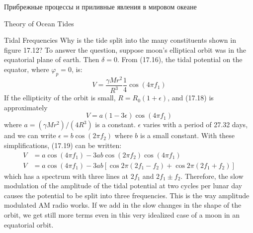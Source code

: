 \begin{chapter}{Прибрежные процессы и приливные явления в мировом океане}
\begin{section}{Theory of Ocean Tides}
\begin{paragraph}{Tidal Frequencies}
Why is the tide split into the many constituents shown in figure
17.12? To answer the question, suppose moon's elliptical orbit was in
the equatorial plane of earth. Then $\delta = 0$. From (17.16), the
tidal potential on the equator, where $\varphi_p =0$, is:
\begin{equation}
V = \frac{\gamma M r^{2}}{R^{3}} \frac{1}{4} \cos \left(4 \pi f_1 \right)
\end{equation}
If the ellipticity of the orbit is small, $R= R_0 (1+\epsilon )$, and
(17.18) is approximately
\begin{equation}
V = a (1-3\epsilon) \cos \left(4 \pi f_1 \right)
\end{equation}
where $a=\left( \gamma M r^2 \right)/\left( 4 R^3 \right)$ is a
constant.  $\epsilon$ varies with a period of 27.32 days, and we can
write $\epsilon = b \cos (2 \pi f_2)$ where $b$ is a small
constant. With these simplifications, (17.19) can be written:
\begin{subequations}
\begin{align}
V &= a \cos \left(4 \pi f_1 \right) -3 a b \cos \left( 2 \pi f_2 \right) \cos \left(4 \pi f_1 \right) \\
V &= a \cos \left(4\pi f_1 \right) - 3 a b \left[ \cos 2\pi \left( 2f_1 - f_2 \right) + \cos 2\pi \left( 2f_1 + f_2 \right) \right]
\end{align}
\end{subequations}
which has a spectrum with three lines at $2 f_1$ and $ 2 f_1 \pm
f_2$. Therefore, the slow modulation of the amplitude of the tidal
potential at two cycles per lunar day causes the potential to be split
into three frequencies. This is the way amplitude modulated AM radio
works. If we add in the slow changes in the shape of the orbit, we get
still more terms even in this very idealized case of a
moon in an equatorial orbit.
%

\end{paragraph}
\end{section}
\end{chapter}
